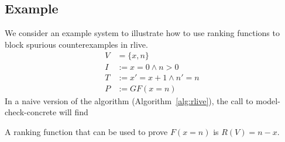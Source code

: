 \documentclass{article}
\newcommand{\rlive}{\textsf{rlive}\xspace}
\newcommand{\mcconc}{\textsf{model-check-concrete}}
\begin{document}
\subsection{Example}


We consider an example system to illustrate how to use ranking functions to block spurious counterexamples in \rlive.
\begin{align*}
    V & = \{x,n\} \\
    I & := x = 0 \land n > 0 \\
    T & := x' = x + 1 \land n' = n \\
    P & := GF(x=n)
\end{align*}
In a naive version of the algorithm (Algorithm~\ref{alg:rlive}), the call to \mcconc{} will find  

A ranking function that can be used to prove $F(x=n)$ is $R(V) = n-x$.



\end{document}
